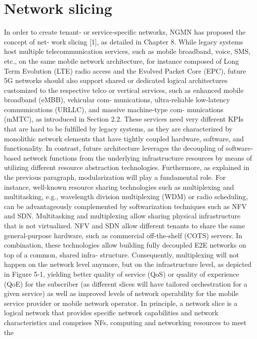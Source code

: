 \documentclass{article}
\begin{document}
\section{Network slicing} %
In order to create tenant‐ or service‐specific networks, NGMN has proposed the concept of net-
work slicing [1], as detailed in Chapter 8. While legacy systems host multiple telecommunication
services, such as mobile broadband, voice, SMS, etc., on the same mobile network architecture, for
instance composed of Long Term Evolution (LTE) radio access and the Evolved Packet Core (EPC),
future 5G networks should also support shared or dedicated logical architectures customized to the
respective telco or vertical services, such as enhanced mobile broadband (eMBB), vehicular com-
munications, ultra‐reliable low‐latency communications (URLLC), and massive machine‐type com-
munications (mMTC), as introduced in Section 2.2. These services need very different KPIs that are
hard to be fulfilled by legacy systems, as they are characterized by monolithic network elements that
have tightly coupled hardware, software, and functionality. In contrast, future architecture leverages the decoupling of software‐based network functions from the underlying infrastructure resources by
means of utilizing different resource abstraction technologies.
Furthermore, as explained in the previous paragraph, modularization will play a fundamental role.
For instance, well‐known resource sharing technologies such as multiplexing and multitasking, e.g.,
wavelength division multiplexing (WDM) or radio scheduling, can be advantageously complemented
by softwarization techniques such as NFV and SDN. Multitasking and multiplexing allow sharing
physical infrastructure that is not virtualized. NFV and SDN allow different tenants to share the
same general‐purpose hardware, such as commercial off‐the‐shelf (COTS) servers. In combination,
these technologies allow building fully decoupled E2E networks on top of a common, shared infra-
structure. Consequently, multiplexing will not happen on the network level anymore, but on the
infrastructure level, as depicted in Figure 5‐1, yielding better quality of service (QoS) or quality of
experience (QoE) for the subscriber (as different slices will have tailored orchestration for a given
service) as well as improved levels of network operability for the mobile service provider or mobile
network operator.
In principle, a network slice is a logical network that provides specific network capabilities and
network characteristics and comprises NFs, computing and networking resources to meet the
\end{document}
